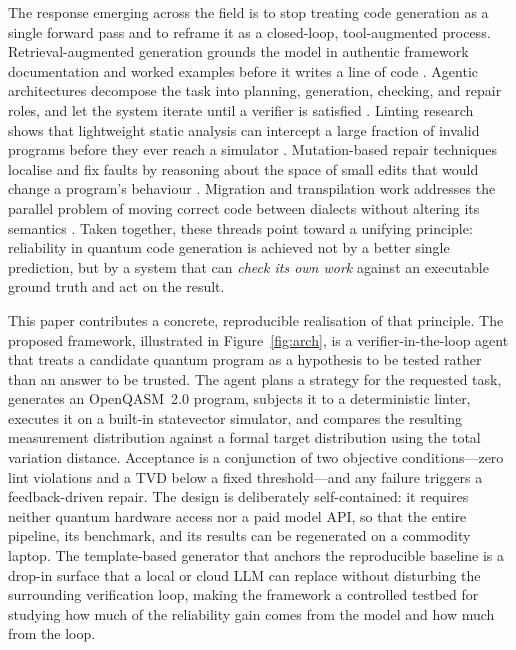 \documentclass[11pt,a4paper]{article}
\begin{document}
The response emerging across the field is to stop treating code generation as a single forward pass and to reframe it as a closed-loop, tool-augmented process. Retrieval-augmented generation grounds the model in authentic framework documentation and worked examples before it writes a line of code \cite{ref5,ref24,ref26}. Agentic architectures decompose the task into planning, generation, checking, and repair roles, and let the system iterate until a verifier is satisfied \cite{ref23,ref25,ref19}. Linting research shows that lightweight static analysis can intercept a large fraction of invalid programs before they ever reach a simulator \cite{ref7}. Mutation-based repair techniques localise and fix faults by reasoning about the space of small edits that would change a program's behaviour \cite{ref14}. Migration and transpilation work addresses the parallel problem of moving correct code between dialects without altering its semantics \cite{ref2,ref10,ref28}. Taken together, these threads point toward a unifying principle: reliability in quantum code generation is achieved not by a better single prediction, but by a system that can \emph{check its own work} against an executable ground truth and act on the result.

This paper contributes a concrete, reproducible realisation of that principle. The proposed framework, illustrated in Figure~\ref{fig:arch}, is a verifier-in-the-loop agent that treats a candidate quantum program as a hypothesis to be tested rather than an answer to be trusted. The agent plans a strategy for the requested task, generates an OpenQASM~2.0 program, subjects it to a deterministic linter, executes it on a built-in statevector simulator, and compares the resulting measurement distribution against a formal target distribution using the total variation distance. Acceptance is a conjunction of two objective conditions---zero lint violations and a TVD below a fixed threshold---and any failure triggers a feedback-driven repair. The design is deliberately self-contained: it requires neither quantum hardware access nor a paid model API, so that the entire pipeline, its benchmark, and its results can be regenerated on a commodity laptop. The template-based generator that anchors the reproducible baseline is a drop-in surface that a local or cloud LLM can replace without disturbing the surrounding verification loop, making the framework a controlled testbed for studying how much of the reliability gain comes from the model and how much from the loop.
\end{document}
